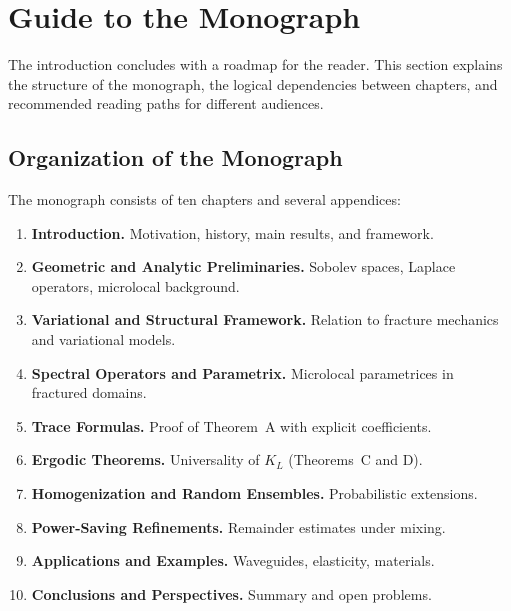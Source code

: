 
\section{Guide to the Monograph}

The introduction concludes with a roadmap for the reader. This section explains
the structure of the monograph, the logical dependencies between chapters, and
recommended reading paths for different audiences.

\subsection{Organization of the Monograph}

The monograph consists of ten chapters and several appendices:

\begin{enumerate}[label=Chapter~\arabic*:]
  \item \textbf{Introduction.} Motivation, history, main results, and framework.
  \item \textbf{Geometric and Analytic Preliminaries.} Sobolev spaces, Laplace
  operators, microlocal background.
  \item \textbf{Variational and Structural Framework.} Relation to fracture
  mechanics and variational models.
  \item \textbf{Spectral Operators and Parametrix.} Microlocal parametrices in
  fractured domains.
  \item \textbf{Trace Formulas.} Proof of Theorem~A with explicit coefficients.
  \item \textbf{Ergodic Theorems.} Universality of $K_L$ (Theorems~C and D).
  \item \textbf{Homogenization and Random Ensembles.} Probabilistic extensions.
  \item \textbf{Power-Saving Refinements.} Remainder estimates under mixing.
  \item \textbf{Applications and Examples.} Waveguides, elasticity, materials.
  \item \textbf{Conclusions and Perspectives.} Summary and open problems.
\end{enumerate}

